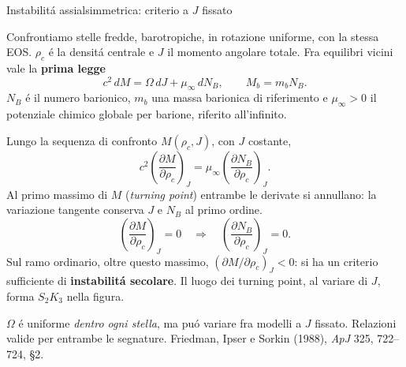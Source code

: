 \begin{frame}[t]{Instabilit\'a assialsimmetrica: criterio a $J$ fissato}
\vspace*{3mm}
\small\raggedright
Confrontiamo stelle fredde, barotropiche, in rotazione uniforme,
con la stessa EOS. $\rho_c$ \'e la densit\'a centrale e $J$ il momento angolare totale.
Fra equilibri vicini vale la \textbf{prima legge}
\[
\boxed{c^2\,dM=\Omega\,dJ+\mu_\infty\,dN_B},
\qquad M_b=m_bN_B.
\]
$N_B$ \'e il numero barionico, $m_b$ una massa barionica di riferimento
e $\mu_\infty>0$ il potenziale chimico globale per barione, riferito all'infinito.
\par\smallskip
Lungo la sequenza di confronto $M(\rho_c,J)$, con $J$ costante,
\[
c^2\left(\frac{\partial M}{\partial\rho_c}\right)_J
=\mu_\infty\left(\frac{\partial N_B}{\partial\rho_c}\right)_J.
\]
Al primo massimo di $M$ (\emph{turning point}) entrambe le derivate si annullano:
la variazione tangente conserva $J$ e $N_B$ al primo ordine.
\[
\boxed{\left(\frac{\partial M}{\partial\rho_c}\right)_J=0}
\quad\Longrightarrow\quad
\left(\frac{\partial N_B}{\partial\rho_c}\right)_J=0.
\]
Sul ramo ordinario, oltre questo massimo,
$\left(\partial M/\partial\rho_c\right)_J<0$:
si ha un criterio sufficiente di \textbf{instabilit\'a secolare}.
Il luogo dei turning point, al variare di $J$, forma $S_2K_3$ nella figura.
\par\smallskip
\footnotesize
$\Omega$ \'e uniforme \emph{dentro ogni stella}, ma pu\'o variare fra modelli a $J$ fissato.
Relazioni valide per entrambe le segnature.
Friedman, Ipser e Sorkin (1988), \emph{ApJ} 325, 722--724, \S2.
\end{frame}

